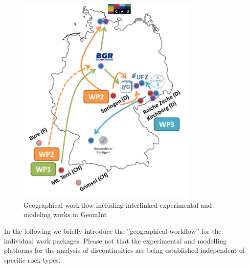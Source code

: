 \begin{figure}[ht!]
\centering
\includegraphics[width=0.8\textwidth]{figures/geomint-all.png}
\caption{Geographical work flow including interlinked experimental and modeling works in GeomInt}
\label{fig:appraoch}
\end{figure}

In the following we briefly introduce the ''geographical workflow'' for the individual work packages. Please not that the experimental and modelling platforms for the analysis of discontinuities are being established independent of specific rock types.

